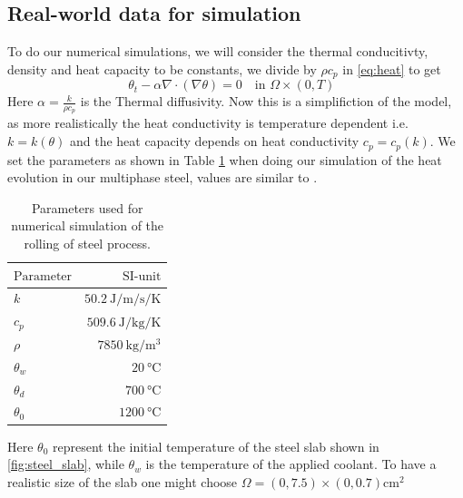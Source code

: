 \subsection{Real-world data for simulation}

To do our numerical simulations, we will consider the thermal conducitivty, density and heat capacity to be constants, we divide by $\rho c_p$ in \eqref{eq:heat} to get 
\begin{equation*}
    \theta_t - \alpha \nabla \cdot (\nabla \theta) = 0 \quad \text{in $\Omega \times (0,T)$ }
\end{equation*}
Here $\alpha = \frac{k}{\rho c_p}$ is the Thermal diffusivity. Now this is a simplifiction of the model, as more realistically the heat conductivity is temperature dependent i.e. $k = k(\theta)$ and the heat capacity depends on heat conductivity $c_p = c_p(k)$. We set the parameters as shown in Table \ref{tab:chosenParam} when doing our simulation of the heat evolution in our multiphase steel, values are similar to \cite{DPSteel}. 
\begin{table}[h]
    \centering
    \caption{Parameters used for numerical simulation of the rolling of steel process.}
    \begin{tabular}{@{}lr@{}} \toprule
    $\text{Parameter}$ & $\text{SI-unit}$ \\
    \midrule
       $k$& $\SI{50.2}{\joule\per\metre\per\second\per\kelvin}$ \\
        $c_p$ & $\SI{509.6}{\joule\per\kilogram\per\kelvin}$ \\
        $\rho$ & $\SI{7850}{\kilogram\per\metre\cubed}$ \\
        $\theta_w$ & $\SI{20}{\celsius}$ \\
        $\theta_d$ & $\SI{700}{\celsius}$ \\
        $\theta_0$ & $\SI{1200}{\celsius}$ \\ \bottomrule
    \end{tabular}
    \label{tab:chosenParam}
\end{table}
Here $\theta_0$ represent the initial temperature of the steel slab shown in \ref{fig:steel_slab}, while $\theta_w$ is the temperature of the applied coolant. To have a realistic size of the slab one might choose $\Omega = (0,7.5)\times(0,0.7) \text{cm}^2$

